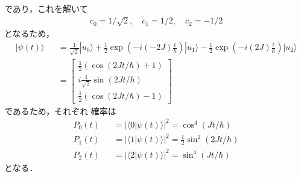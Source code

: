 \documentclass[12pt,dvipdfmx]{jsarticle}
\begin{document}
であり，これを解いて
\begin{eqnarray}
  c_0 = 1/\sqrt{2},\quad c_1 = 1/2,\quad c_2 = -1/2
\end{eqnarray}
となるため，
\begin{eqnarray}
  |\psi(t)\rangle &&= \frac{1}{\sqrt{2}}|u_0\rangle + \frac{1}{2}\exp\left( -i(-2J)\frac{t}{\hbar} \right)|u_1\rangle-\frac{1}{2}\exp\left( -i(2J)\frac{t}{\hbar} \right)|u_2\rangle\\
  &&= 
  \begin{bmatrix}
    \frac{1}{2}(\cos(2Jt/\hbar)+1) \\
    i \frac{1}{\sqrt{2}}\sin(2Jt/\hbar)\\
    \frac{1}{2}(\cos(2Jt/\hbar)-1) 
  \end{bmatrix}
\end{eqnarray}
であるため，それぞれ
確率は
\begin{eqnarray}
  P_0(t) &&= |\langle 0|\psi(t)\rangle|^2 = \cos^4(Jt/\hbar)\\
  P_1(t) &&= |\langle 1|\psi(t)\rangle|^2 =\frac{1}{2} \sin^2(2Jt/\hbar)\\
  P_2(t) &&= |\langle 2|\psi(t)\rangle|^2 = \sin^4(Jt/\hbar)
\end{eqnarray}
となる．
\end{document}
